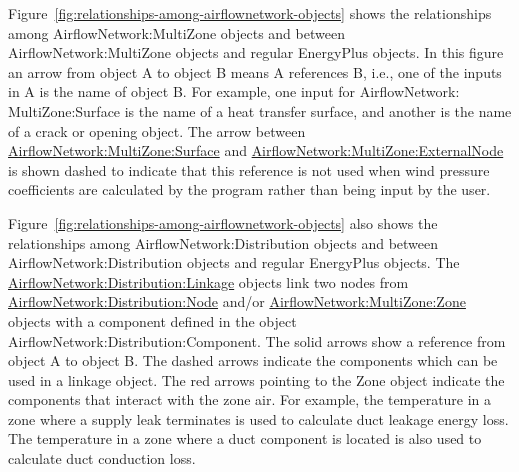 Figure~\ref{fig:relationships-among-airflownetwork-objects} shows the relationships among AirflowNetwork:MultiZone objects and between AirflowNetwork:MultiZone objects and regular EnergyPlus objects. In this figure an arrow from object A to object B means A references B, i.e., one of the inputs in A is the name of object B. For example, one input for AirflowNetwork: MultiZone:Surface is the name of a heat transfer surface, and another is the name of a crack or opening object. The arrow between \hyperref[airflownetworkmultizonesurface]{AirflowNetwork:MultiZone:Surface} and \hyperref[airflownetworkmultizoneexternalnode]{AirflowNetwork:MultiZone:ExternalNode} is shown dashed to indicate that this reference is not used when wind pressure coefficients are calculated by the program rather than being input by the user.

Figure~\ref{fig:relationships-among-airflownetwork-objects} also shows the relationships among AirflowNetwork:Distribution objects and between AirflowNetwork:Distribution objects and regular EnergyPlus objects. The \hyperref[airflownetworkdistributionlinkage]{AirflowNetwork:Distribution:Linkage} objects link two nodes from \hyperref[airflownetworkdistributionnode]{AirflowNetwork:Distribution:Node} and/or \hyperref[airflownetworkmultizonezone]{AirflowNetwork:MultiZone:Zone} objects with a component defined in the object AirflowNetwork:Distribution:Component. The solid arrows show a reference from object A to object B. The dashed arrows indicate the components which can be used in a linkage object. The red arrows pointing to the Zone object indicate the components that interact with the zone air. For example, the temperature in a zone where a supply leak terminates is used to calculate duct leakage energy loss. The temperature in a zone where a duct component is located is also used to calculate duct conduction loss.

